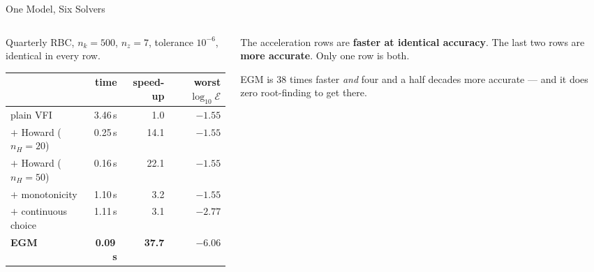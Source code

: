 \begin{frame}{One Model, Six Solvers}
\begin{columns}[T]
\begin{column}{0.56\textwidth}
\small
Quarterly RBC, $n_k=500$, $n_z=7$, tolerance $10^{-6}$, identical in every row.
\medskip
\begin{center}\scriptsize
\begin{tabularx}{\linewidth}{@{}>{\raggedright\arraybackslash}X r r r@{}}
\toprule
 & \textbf{time} & \textbf{speed-up} & \textbf{worst $\log_{10}\mathcal{E}$} \\
\midrule
plain VFI & 3.46\,s & 1.0 & $-1.55$ \\
$+$ Howard ($n_H{=}20$) & 0.25\,s & 14.1 & $-1.55$ \\
$+$ Howard ($n_H{=}50$) & 0.16\,s & 22.1 & $-1.55$ \\
$+$ monotonicity & 1.10\,s & 3.2 & $-1.55$ \\
$+$ continuous choice & 1.11\,s & 3.1 & $-2.77$ \\
\textbf{EGM} & \textbf{0.09\,s} & \textbf{37.7} & $\mathbf{-6.06}$ \\
\bottomrule
\end{tabularx}
\end{center}
\end{column}
\begin{column}{0.41\textwidth}
\begin{takeawaybox}[title=\textbf{Read the two columns separately}]\small
The acceleration rows are \textbf{faster at identical accuracy}. The last two rows are \textbf{more accurate}. Only one row is both.
\end{takeawaybox}
\medskip
\begin{examplebox}\footnotesize
EGM is 38 times faster \emph{and} four and a half decades more accurate --- and it does zero root-finding to get there.
\end{examplebox}
\end{column}
\end{columns}
\end{frame}

